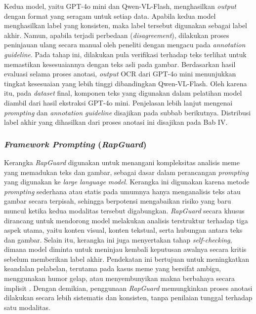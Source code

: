 Kedua model, yaitu GPT-4o mini dan Qwen-VL-Flash, menghasilkan \textit{output} dengan format yang seragam untuk setiap data. Apabila kedua model menghasilkan label yang konsisten, maka label tersebut digunakan sebagai label akhir. Namun, apabila terjadi perbedaan (\textit{disagreement}), dilakukan proses peninjauan ulang secara manual oleh peneliti dengan mengacu pada \textit{annotation guideline}. Pada tahap ini, dilakukan pula verifikasi terhadap teks terlihat untuk memastikan kesesuaiannya dengan teks asli pada gambar. Berdasarkan hasil evaluasi selama proses anotasi, \textit{output} OCR dari GPT-4o mini menunjukkan tingkat kesesuaian yang lebih tinggi dibandingkan Qwen-VL-Flash. Oleh karena itu, pada \textit{dataset} final, komponen teks yang digunakan dalam pelatihan model diambil dari hasil ekstraksi GPT-4o mini. Penjelasan lebih lanjut mengenai \textit{prompting} dan \textit{annotation guideline} disajikan pada subbab berikutnya. Distribusi label akhir yang dihasilkan dari proses anotasi ini disajikan pada Bab IV.

\subsubsection{\textit{Framework Prompting} (\textit{RapGuard})} \label{subsubsec:framework_prompting_rapguard}
Kerangka \textit{RapGuard} digunakan untuk menangani kompleksitas analisis meme yang memadukan teks dan gambar, sebagai dasar dalam perancangan \textit{prompting} yang digunakan ke \textit{large language model}. Kerangka ini digunakan karena metode \textit{prompting} sederhana atau statis pada umumnya hanya menganalisis teks atau gambar secara terpisah, sehingga berpotensi mengabaikan risiko yang baru muncul ketika kedua modalitas tersebut digabungkan. \textit{RapGuard} secara khusus dirancang untuk mendorong model melakukan analisis terstruktur terhadap tiga aspek utama, yaitu konten visual, konten tekstual, serta hubungan antara teks dan gambar. Selain itu, kerangka ini juga menyertakan tahap \textit{self-checking}, dimana model diminta untuk meninjau kembali keputusan awalnya secara kritis sebelum memberikan label akhir. Pendekatan ini bertujuan untuk meningkatkan keandalan pelabelan, terutama pada kasus meme yang bersifat ambigu, menggunakan humor gelap, atau menyembunyikan makna berbahaya secara implisit \cite{Jiang2024RapGuard}. Dengan demikian, penggunaan \textit{RapGuard} memungkinkan proses anotasi dilakukan secara lebih sistematis dan konsisten, tanpa penilaian tunggal terhadap satu modalitas.


